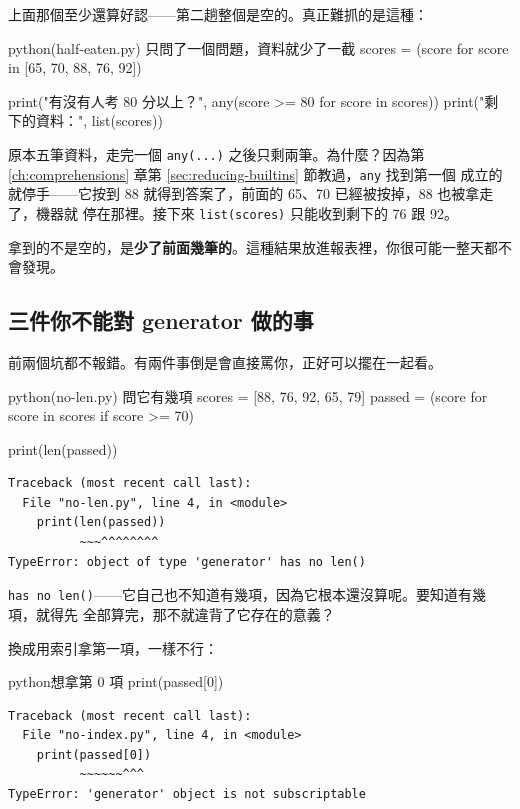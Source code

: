 上面那個至少還算好認——第二趟整個是空的。真正難抓的是這種：

\begin{example}{python}{(half-eaten.py) 只問了一個問題，資料就少了一截}
scores = (score for score in [65, 70, 88, 76, 92])

print("有沒有人考 80 分以上？", any(score >= 80 for score in scores))
print("剩下的資料：", list(scores))
\end{example}


原本五筆資料，走完一個 \texttt{any(...)} 之後只剩兩筆。為什麼？因為第
\ref{ch:comprehensions} 章第 \ref{sec:reducing-builtins} 節教過，\texttt{any} 找到第一個
成立的就停手——它按到 88 就得到答案了，前面的 65、70 已經被按掉，88 也被拿走了，機器就
停在那裡。接下來 \texttt{list(scores)} 只能收到剩下的 76 跟 92。

拿到的不是空的，是\textbf{少了前面幾筆的}。這種結果放進報表裡，你很可能一整天都不會發現。

\subsection*{三件你不能對 generator 做的事}

前兩個坑都不報錯。有兩件事倒是會直接罵你，正好可以擺在一起看。

\begin{example}{python}{(no-len.py) 問它有幾項}
scores = [88, 76, 92, 65, 79]
passed = (score for score in scores if score >= 70)

print(len(passed))
\end{example}

\begin{verbatim}
Traceback (most recent call last):
  File "no-len.py", line 4, in <module>
    print(len(passed))
          ~~~^^^^^^^^
TypeError: object of type 'generator' has no len()
\end{verbatim}

\texttt{has no len()}——它自己也不知道有幾項，因為它根本還沒算呢。要知道有幾項，就得先
全部算完，那不就違背了它存在的意義？

換成用索引拿第一項，一樣不行：

\begin{code}{python}{想拿第 0 項}
print(passed[0])
\end{code}

\begin{verbatim}
Traceback (most recent call last):
  File "no-index.py", line 4, in <module>
    print(passed[0])
          ~~~~~~^^^
TypeError: 'generator' object is not subscriptable
\end{verbatim}

